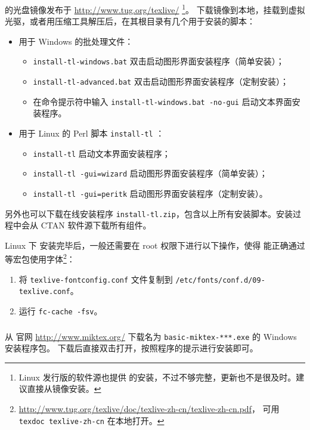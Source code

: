 \subsubsection{}

 的光盘镜像发布于 \url{http://www.tug.org/texlive/}%
\footnote{Linux 发行版的软件源也提供  的安装，不过不够完整，更新也不是很及时。建议直接从镜像安装。}。
下载镜像到本地，挂载到虚拟光驱，或者用压缩工具解压后，在其根目录有几个用于安装的脚本：
\begin{itemize}
  \item 用于 Windows 的批处理文件：
  \begin{itemize}
    \item \texttt{install-tl-windows.bat} 双击启动图形界面安装程序（简单安装）；
    \item \texttt{install-tl-advanced.bat} 双击启动图形界面安装程序（定制安装）；
    \item 在命令提示符中输入 \texttt{install-tl-windows.bat -no-gui} 启动文本界面安装程序。
  \end{itemize}
  \item 用于 Linux 的 Perl 脚本 \texttt{install-tl} ：
  \begin{itemize}
    \item \texttt{install-tl} 启动文本界面安装程序；
    \item \texttt{install-tl -gui=wizard} 启动图形界面安装程序（简单安装）；
    \item \texttt{install-tl -gui=peritk} 启动图形界面安装程序（定制安装）。
  \end{itemize}
\end{itemize}
另外也可以下载在线安装程序 \texttt{install-tl.zip}，包含以上所有安装脚本。安装过程中会从 CTAN 软件源下载所有组件。

Linux 下  安装完毕后，一般还需要在 root 权限下进行以下操作，使得  能正确通过 
等宏包使用字体\footnote{\url{http://www.tug.org/texlive/doc/texlive-zh-cn/texlive-zh-cn.pdf}，%
可用 \texttt{texdoc texlive-zh-cn} 在本地打开。}：
\begin{enumerate}
  \item 将 \texttt{texlive-fontconfig.conf} 文件复制到 \texttt{/etc/fonts/conf.d/09-texlive.conf}。
  \item 运行 \texttt{fc-cache -fsv}。
\end{enumerate}

\subsubsection{}
从  官网 \url{http://www.miktex.org/} 下载名为 \texttt{basic-miktex-***.exe} 的 Windows 安装程序包。
下载后直接双击打开，按照程序的提示进行安装即可。


